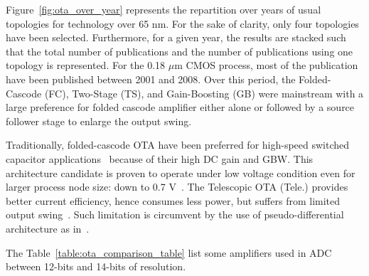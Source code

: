 Figure~\ref{fig:ota_over_year} represents the repartition over years of usual topologies for technology over 65 nm. For the sake of clarity, only four topologies have been selected. Furthermore, for a given year, the results are stacked such that the total number of publications and the number of publications using one topology is represented.
For the 0.18 \(\mu \)m CMOS process, most of the publication have been published between 2001 and 2008. Over this period, the Folded-Cascode (FC), Two-Stage (TS), and Gain-Boosting (GB) were mainstream with a large preference for folded cascode amplifier either alone or followed by a source follower stage to enlarge the output swing.

Traditionally, folded-cascode OTA have been preferred for high-speed switched capacitor applications~\cite{Olivera1999, Adut2003} because of their high DC gain and GBW\@. This architecture candidate is proven to operate under low voltage condition even for larger process node size: down to 0.7 V~\cite{Sauerbrey2002, Ahn2005}.
The Telescopic OTA (Tele.) provides better current efficiency, hence consumes less power, but suffers from limited output swing~\cite{Quinn2000}. Such limitation is circumvent by the use of pseudo-differential architecture as in~\cite{Chiu2004}.

The Table~\ref{table:ota_comparison_table} list some amplifiers used in ADC between 12-bits and 14-bits of resolution. 

